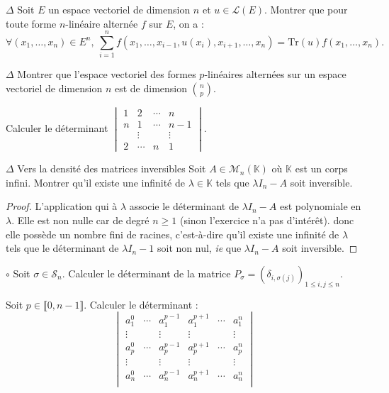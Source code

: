\documentclass[french,a4paper]{article}
\newcommand{\K}{\mathbb{K}}
\newcommand{\Tr}{\text{Tr}}
\theoremstyle{plain}
\theoremstyle{definition}
\theoremstyle{remark}
\begin{document}
\begin{ex}{$\Delta$}
	Soit $E$ un espace vectoriel de dimension $n$ et $u\in\mathcal{L}(E)$. Montrer que pour toute forme $n$-linéaire alternée $f$ sur $E$, on a : $$\forall (x_1,\ldots,x_n)\in E^n,\ \sum_{i=1}^{n}f(x_1,\ldots,x_{i-1},u(x_i),x_{i+1},\ldots,x_n)=\Tr(u)f(x_1,\ldots,x_n).$$
\end{ex}

\begin{ex}{$\Delta$}
	Montrer que l'espace vectoriel des formes $p$-linéaires alternées sur un espace vectoriel de dimension $n$ est de dimension $\displaystyle\binom{n}{p}$.
\end{ex}

\begin{ex}{}
	Calculer le déterminant $\displaystyle\begin{vmatrix}
		1&2&\cdots&n\\
		n&1&\cdots&n-1\\
		&\vdots&&\vdots\\
		2&\cdots&n&1
	\end{vmatrix}$.
\end{ex}

\begin{ex}{$\Delta$ Vers la densité des matrices inversibles}
	Soit $A\in\mathcal{M}_n(\K)$ où $\K$ est un corps infini. Montrer qu'il existe une infinité de $\lambda\in\K$ tels que $\lambda I_n-A$ soit inversible.
\end{ex}
\begin{proof}
	L'application qui à $\lambda$ associe le déterminant de $\lambda I_n-A$ est polynomiale en $\lambda$. Elle est non nulle car de degré $n\geqslant 1$ (sinon l'exercice n'a pas d'intérêt). donc elle possède un nombre fini de racines, c'est-à-dire qu'il existe une infinité de $\lambda$ tels que le déterminant de $\lambda I_n-1$ soit non nul, \textit{ie} que $\lambda I_n-A$ soit inversible.
\end{proof}

\begin{ex}{$\circ$}
	Soit $\sigma\in\mathcal{S}_n$. Calculer le déterminant de la matrice $P_\sigma=\left(\delta_{i,\sigma(j)}\right)_{1\leqslant i,j\leqslant n}$.
\end{ex}

\begin{ex}{}
	Soit $p\in\llbracket0,n-1\rrbracket$. Calculer le déterminant : $$\begin{vmatrix}
		a_1^0&\cdots&a_1^{p-1}&a_1^{p+1}&\cdots&a_1^n\\
		\vdots&&\vdots&\vdots&&\vdots\\
		a_p^0&\cdots&a_p^{p-1}&a_p^{p+1}&\cdots&a_p^n\\
		\vdots&&\vdots&\vdots&&\vdots\\
		a_n^0&\cdots&a_n^{p-1}&a_n^{p+1}&\cdots&a_n^n\\
	\end{vmatrix}$$
\end{ex}
\end{document}
